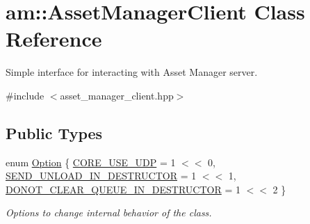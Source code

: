 \hypertarget{classam_1_1_asset_manager_client}{
\section{am::AssetManagerClient Class Reference}
\label{classam_1_1_asset_manager_client}
}


Simple interface for interacting with Asset Manager server.  




{\ttfamily \#include $<$asset\_\-manager\_\-client.hpp$>$}

\subsection*{Public Types}
\begin{DoxyCompactItemize}
\item 
enum \hyperlink{classam_1_1_asset_manager_client_a46c830784e6b2983faa4764d1cad8204}{Option} \{ \hyperlink{classam_1_1_asset_manager_client_a46c830784e6b2983faa4764d1cad8204afbddc98293c73fb9327140202446bcd3}{CORE\_\-USE\_\-UDP} =  1 $<$$<$ 0, 
\hyperlink{classam_1_1_asset_manager_client_a46c830784e6b2983faa4764d1cad8204a12d66e04635284dd63ade2bac119a6df}{SEND\_\-UNLOAD\_\-IN\_\-DESTRUCTOR} =  1 $<$$<$ 1, 
\hyperlink{classam_1_1_asset_manager_client_a46c830784e6b2983faa4764d1cad8204a8572f40c3d36da034eb81a13e04eab23}{DONOT\_\-CLEAR\_\-QUEUE\_\-IN\_\-DESTRUCTOR} =  1 $<$$<$ 2
 \}
\begin{DoxyCompactList}\small\item\em Options to change internal behavior of the class. \end{DoxyCompactList}\end{DoxyCompactItemize}
